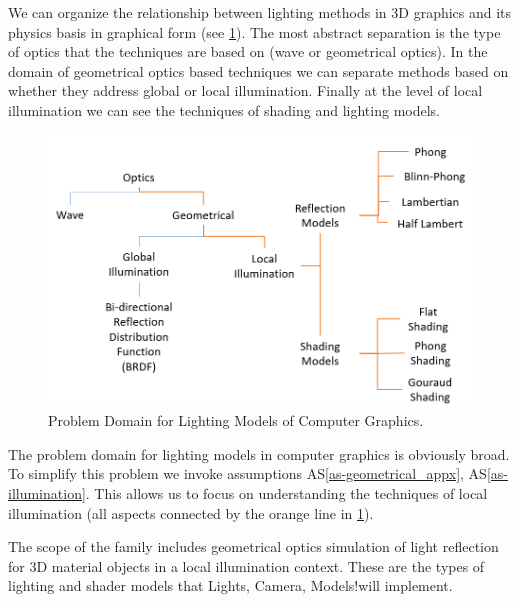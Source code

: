 \documentclass[12pt]{article}
\newcommand{\aSref}[1]{AS\ref{#1}}
\newcommand{\famname}{Lights, Camera, Models!} %
\begin{document}
We can organize the relationship between lighting methods in 3D graphics and 
its physics basis in graphical form (see \ref{fig:prob-domain-analysis}). The 
most abstract separation is the type of optics that the techniques are based on 
(wave or geometrical optics). In the domain of geometrical optics based 
techniques we can separate methods based on whether they address global or 
local illumination. Finally at the level of local illumination we can see the 
techniques of shading and lighting models.

\begin{figure}[h]
	\centering
	\includegraphics[scale=0.5]{./images/problem-domain-analysis}
	\caption{Problem Domain for Lighting Models of Computer Graphics.}
	\label{fig:prob-domain-analysis}
\end{figure}


The problem domain for lighting models in computer graphics is obviously broad. 
To simplify this problem we invoke assumptions \aSref{as-geometrical_appx}, 
\aSref{as-illumination}. This allows us to focus on understanding the 
techniques of local illumination (all aspects connected by the orange line in 
\ref{fig:prob-domain-analysis}).

The scope of the family includes geometrical optics simulation of light 
reflection for 3D material objects in a local illumination context. These are 
the types of lighting and shader models that \famname  will implement.
\end{document}
